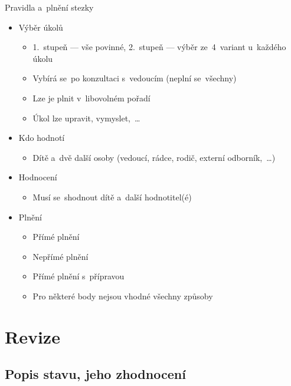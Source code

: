 \documentclass[compress, ucs, xelatex, 11pt, xcolor=dvipsnames, print, aspectratio=169,
	hyperref={
		bookmarks=true,
		unicode=true,
		colorlinks=true,
		pdftitle={Skautska vychovna metoda},
		plainpages=false,
		pdfauthor={Vojtech Zeisek},
		pdfsubject={Skautska vychovna metoda a jeji vyvoj za posledni stoleti a desetileti},
		pdfcreator={XeLaTeX},
		pdfkeywords={Junak, Pedagogika, Skaut, Skauting, Vychovna metoda},
		linkcolor=Red, %
		anchorcolor=ForestGreen, %
		citecolor=ForestGreen, %
		filecolor=ForestGreen, %
		menucolor=ForestGreen, %
		urlcolor=Sepia, %
		pdftex},
	url={hyphens, lowtilde} %
	]{beamer}
\begin{document}
\begin{frame}{Pravidla a~plnění stezky}
	\begin{itemize}
		\item Výběr úkolů
		\begin{itemize}
			\item 1.~stupeň --- vše povinné, 2.~stupeň --- výběr ze~4~variant u~každého úkolu
			\item Vybírá se~po konzultaci s~vedoucím (neplní se~všechny)
			\item Lze je plnit v~libovolném pořadí
			\item Úkol lze upravit, vymyslet,~\ldots
		\end{itemize}
		\item Kdo hodnotí
		\begin{itemize}
			\item Dítě a~dvě další osoby (vedoucí, rádce, rodič, externí odborník,~\ldots)
		\end{itemize}
		\item Hodnocení
		\begin{itemize}
			\item Musí se~shodnout dítě a~další hodnotitel(é)
		\end{itemize}
		\item Plnění
		\begin{itemize}
			\item Přímé plnění
			\item Nepřímé plnění
			\item Přímé plnění s~přípravou
			\item Pro některé body nejsou vhodné všechny způsoby
		\end{itemize}
	\end{itemize}
\end{frame}

\section{Revize}

\subsection{Popis stavu, jeho zhodnocení}
\end{document}
